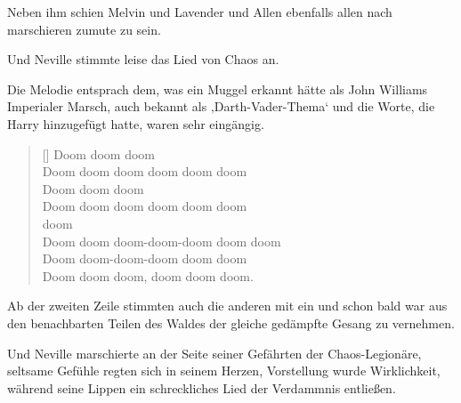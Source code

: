 Neben ihm schien Melvin und Lavender und Allen ebenfalls allen nach marschieren zumute zu sein.

Und Neville stimmte leise das Lied von Chaos an.

Die Melodie entsprach dem, was ein Muggel erkannt hätte als John Williams Imperialer Marsch, auch bekannt als ‚Darth-Vader-Thema‘ und die Worte, die Harry hinzugefügt hatte, waren sehr eingängig.%

\baselineskip\settowidth{\versewidth}{Doom doom doom-doom-doom doom doom}
\begin{verse}[\versewidth]
Doom doom doom\\
Doom doom doom doom doom doom\\
Doom doom doom\\
Doom doom doom doom doom doom\\
 doom \\
Doom doom doom-doom-doom doom doom\\
Doom doom-doom-doom doom doom\\
Doom doom doom, doom doom doom.
\end{verse}\baselineskip

Ab der zweiten Zeile stimmten auch die anderen mit ein und schon bald war aus den benachbarten Teilen des Waldes der gleiche gedämpfte Gesang zu vernehmen.

Und Neville marschierte an der Seite seiner Gefährten der Chaos-Legionäre, seltsame Gefühle regten sich in seinem Herzen, Vorstellung wurde Wirklichkeit, während seine Lippen ein schreckliches Lied der Verdammnis entließen.

